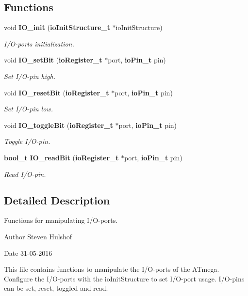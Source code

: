 \subsection*{Functions}
\begin{DoxyCompactItemize}
\item 
void {\bf I\+O\+\_\+init} ({\bf io\+Init\+Structure\+\_\+t} $\ast$io\+Init\+Structure)
\begin{DoxyCompactList}\small\item\em I/\+O-\/ports initialization. \end{DoxyCompactList}\item 
void {\bf I\+O\+\_\+set\+Bit} ({\bf io\+Register\+\_\+t} $\ast$port, {\bf io\+Pin\+\_\+t} pin)
\begin{DoxyCompactList}\small\item\em Set I/\+O-\/pin high. \end{DoxyCompactList}\item 
void {\bf I\+O\+\_\+reset\+Bit} ({\bf io\+Register\+\_\+t} $\ast$port, {\bf io\+Pin\+\_\+t} pin)
\begin{DoxyCompactList}\small\item\em Set I/\+O-\/pin low. \end{DoxyCompactList}\item 
void {\bf I\+O\+\_\+toggle\+Bit} ({\bf io\+Register\+\_\+t} $\ast$port, {\bf io\+Pin\+\_\+t} pin)
\begin{DoxyCompactList}\small\item\em Toggle I/\+O-\/pin. \end{DoxyCompactList}\item 
{\bf bool\+\_\+t} {\bf I\+O\+\_\+read\+Bit} ({\bf io\+Register\+\_\+t} $\ast$port, {\bf io\+Pin\+\_\+t} pin)
\begin{DoxyCompactList}\small\item\em Read I/\+O-\/pin. \end{DoxyCompactList}\end{DoxyCompactItemize}


\subsection{Detailed Description}
Functions for manipulating I/\+O-\/ports. 

\begin{DoxyAuthor}{Author}
Steven Hulshof
\end{DoxyAuthor}
\begin{DoxyDate}{Date}
31-\/05-\/2016
\end{DoxyDate}
This file contains functions to manipulate the I/\+O-\/ports of the A\+Tmega. Configure the I/\+O-\/ports with the io\+Init\+Structure to set I/\+O-\/port usage. I/\+O-\/pins can be set, reset, toggled and read.



